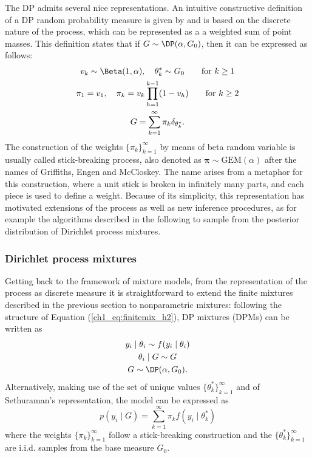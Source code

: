 The DP admits several nice representations. An intuitive constructive definition of a DP random probability measure is given by \citet{sethuraman1994} and is based on the discrete nature of the process, which can be represented as a a weighted sum of point masses. This definition states that if  $G\sim \DP(\alpha, G_0)$, then it can be expressed as follows:
\begin{gather} 
v_k \sim \Beta(1,\alpha), \quad \theta^*_k \sim G_0 \qquad \text{for } k\geq 1  \nonumber\\
\pi_1 = v_1, \quad \pi_k = v_k \prod_{h = 1}^{k-1} (1-v_h) \qquad \text{for } k\geq 2 \label{ch1_eq:stickbreaking}\\
G = \sum_{k=1}^{\infty} \pi_k \delta_{\theta^*_k}. \nonumber
\end{gather}
The construction of the weights $\{\pi_k\}_{k=1}^{\infty}$ by means of beta random variable is usually called stick-breaking process, also denoted as $\bm{\pi}\sim \mathrm{GEM}(\alpha)$ after the names of Griffiths, Engen and McCloskey. The name arises from a metaphor for this construction, where a unit stick is broken in infinitely many parts, and each piece is used to define a weight.
Because of its simplicity, this representation has motivated extensions of the process as well as new inference procedures, as for example the algorithms described in the following to sample from the posterior distribution of Dirichlet process mixtures.


\subsubsection*{Dirichlet process mixtures}
Getting back to the framework of mixture models, from the representation of the process as discrete measure it is straightforward to extend the finite mixtures described in the previous section to nonparametric mixtures: following the structure of Equation (\ref{ch1_eq:finitemix_h2}), DP mixtures (DPMs) can be written as
\begin{equation*}
\begin{gathered}
y_i \mid \theta_i \sim f(y_i\mid\theta_i)\\
\theta_i \mid G \sim G \\
G \sim \DP(\alpha,G_0).
\end{gathered}
\end{equation*}
Alternatively, making use of the set of unique values $\{\theta^*_k\}_{k=1}^{\infty}$ and of Sethuraman's representation, the model can be expressed as
\begin{equation}
p(y_i\mid G) = \sum_{k=1}^{\infty} \pi_k f(y_i\mid\theta^*_k)
\label{ch1_eq:DPM}
\end{equation}
where the weights $\{\pi_k\}_{k=1}^{\infty}$ follow a stick-breaking construction and the $\{\theta^*_k\}_{k=1}^{\infty}$ are i.i.d. samples from the base measure $G_0$.

